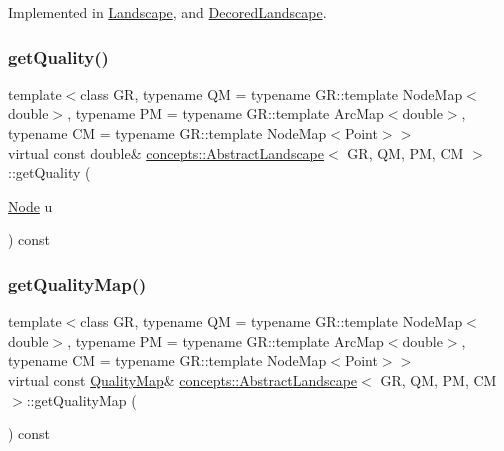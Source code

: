 Implemented in \hyperlink{class_landscape_a771053b32bbcb6a3fa5204b8bdb53a6d}{Landscape}, and \hyperlink{class_decored_landscape_afdc878affae92d7c671f1e0f87223ee0}{Decored\+Landscape}.

\mbox{\label{classconcepts_1_1_abstract_landscape_a7cab5e0f48eda3a95df9bee95a5a6358}} 
\subsubsection{\texorpdfstring{get\+Quality()}{getQuality()}}
{\footnotesize\ttfamily template$<$class GR, typename QM = typename G\+R\+::template Node\+Map$<$double$>$, typename PM = typename G\+R\+::template Arc\+Map$<$double$>$, typename CM = typename G\+R\+::template Node\+Map$<$\+Point$>$$>$ \\
virtual const double\& \hyperlink{classconcepts_1_1_abstract_landscape}{concepts\+::\+Abstract\+Landscape}$<$ GR, QM, PM, CM $>$\+::get\+Quality (\begin{DoxyParamCaption}\item[{\hyperlink{classconcepts_1_1_abstract_landscape_a7c2f90fb9f42302f1af84a59f4df4b91}{Node}}]{u }\end{DoxyParamCaption}) const\hspace{0.3cm}{\ttfamily [pure virtual]}}

\mbox{\label{classconcepts_1_1_abstract_landscape_ab0ff4aa5ac8d95d9207e32582e3e95f2}} 
\subsubsection{\texorpdfstring{get\+Quality\+Map()}{getQualityMap()}}
{\footnotesize\ttfamily template$<$class GR, typename QM = typename G\+R\+::template Node\+Map$<$double$>$, typename PM = typename G\+R\+::template Arc\+Map$<$double$>$, typename CM = typename G\+R\+::template Node\+Map$<$\+Point$>$$>$ \\
virtual const \hyperlink{classconcepts_1_1_abstract_landscape_aab540b896ac9b7a7a5783f2a78f304ad}{Quality\+Map}\& \hyperlink{classconcepts_1_1_abstract_landscape}{concepts\+::\+Abstract\+Landscape}$<$ GR, QM, PM, CM $>$\+::get\+Quality\+Map (\begin{DoxyParamCaption}{ }\end{DoxyParamCaption}) const\hspace{0.3cm}{\ttfamily [pure virtual]}}




